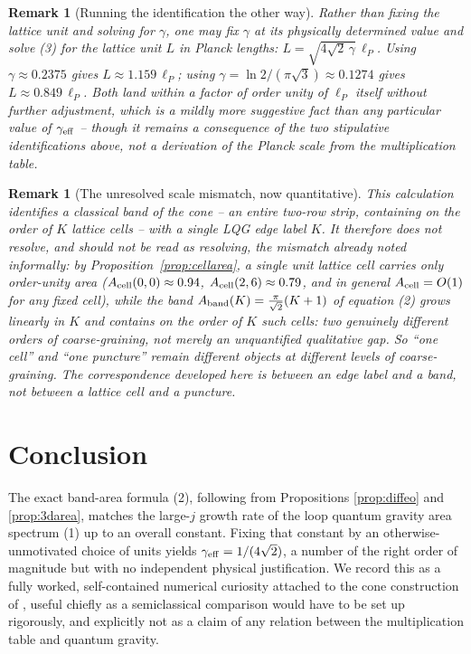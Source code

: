 \documentclass[11pt]{amsart}
\newtheorem{remark}[proposition]{Remark}
\theoremstyle{remark}
\begin{document}
\begin{remark}[Running the identification the other way]
Rather than fixing the lattice unit and solving for $\gamma$, one may fix $\gamma$ at
its physically determined value and solve (3) for the lattice unit $L$ in Planck
lengths: $L=\sqrt{4\sqrt2\,\gamma}\,\ell_P$. Using $\gamma\approx0.2375$
\cite{Meissner2004} gives $L\approx1.159\,\ell_P$; using
$\gamma=\ln2/(\pi\sqrt3)\approx0.1274$ \cite{Ashtekar-Baez-Krasnov2000} gives
$L\approx0.849\,\ell_P$. Both land within a factor of order unity of $\ell_P$ itself
without further adjustment, which is a mildly more suggestive fact than any particular
value of $\gamma_{\rm eff}$ -- though it remains a consequence of the two stipulative
identifications above, not a derivation of the Planck scale from the multiplication
table.
\end{remark}

\begin{remark}[The unresolved scale mismatch, now quantitative]
This calculation identifies a classical \emph{band} of the cone -- an entire two-row
strip, containing on the order of $K$ lattice cells -- with a \emph{single} LQG edge
label $K$. It therefore does not resolve, and should not be read as resolving, the
mismatch already noted informally: by Proposition~\ref{prop:cellarea}, a single unit
lattice cell carries only order-unity area ($A_{\rm cell}(0,0)\approx0.94$,
$A_{\rm cell}(2,6)\approx0.79$, and in general $A_{\rm cell}=O(1)$ for any fixed cell),
while the band $A_{\rm band}(K)=\tfrac\pi{\sqrt2}(K+1)$ of equation (2) grows linearly in
$K$ and contains on the order of $K$ such cells: two genuinely different orders of
coarse-graining, not merely an unquantified qualitative gap. So ``one cell'' and ``one
puncture'' remain different objects at different
levels of coarse-graining. The correspondence developed here is between an edge label
and a \emph{band}, not between a lattice cell and a puncture.
\end{remark}

\section{Conclusion}

The exact band-area formula (2), following from Propositions \ref{prop:diffeo}
and \ref{prop:3darea}, matches the large-$j$ growth rate of the loop quantum gravity
area spectrum (1) up to an overall constant. Fixing that constant by an
otherwise-unmotivated choice of units yields $\gamma_{\rm eff}=1/(4\sqrt2)$, a number
of the right order of magnitude but with no independent physical justification. We
record this as a fully worked, self-contained numerical curiosity attached to the
cone construction of \cite{Ebert2026Table,Ebert2026Quantum}, useful chiefly as a
semiclassical comparison would have to be set up rigorously, and explicitly not as a
claim of any relation between the multiplication table and quantum gravity.
\end{document}
